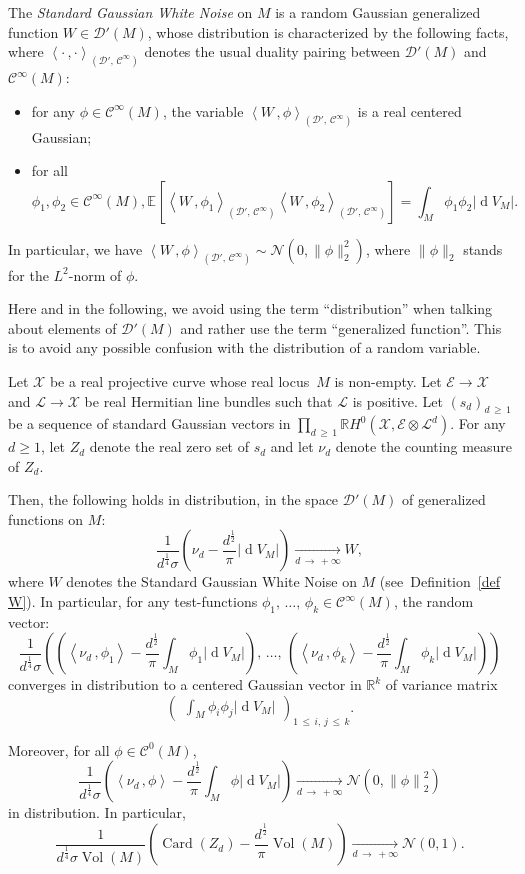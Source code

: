 \documentclass[AHL,Unicode,longabstracts,published]{cedram}
\DeclareMathOperator{\card}{Card}
\DeclareMathOperator{\dmesure}{d}
\DeclareMathOperator{\Vol}{Vol}
\newcommand{\D}{\mathcal{D}}
\newcommand{\E}{\mathcal{E}}
\newcommand{\X}{\mathcal{X}}
\renewcommand{\L}{\mathcal{L}}
\newcommand{\clN}{\mathcal{N}}
\newcommand{\clC}{\mathcal{C}}
\newcommand{\R}{\mathbb{R}}
\newcommand{\esp}[2][]{\mathbb{E}_{#1}\!\left[#2 \right]}
\newcommand{\norm}[1]{\left\lvert #1 \right\rvert}
\newcommand{\Norm}[1]{\left\lVert #1 \right\rVert}
\newcommand{\prsc}[2]{\left\langle #1\,, #2 \right\rangle}
\newcommand{\rmes}[1]{\norm{\dmesure\! V_{#1}}}
\newcommand{\vol}[1]{\Vol\!\left(#1\right)}
\renewcommand{\H}{H^0(\X,\E \otimes \L^d)}
\renewcommand{\geq}{\geqslant}
\renewcommand{\leq}{\leqslant}
\begin{document}
\begin{defi}\label{def W}
The \emph{Standard Gaussian White Noise} on $M$ is a random Gaussian generalized function $W \in \D'(M)$, whose distribution is characterized by the following facts, where $\prsc{\cdot}{\cdot}_{(\D',\,\clC^\infty)}$ denotes the usual duality pairing between $\D'(M)$ and $\clC^\infty(M)$:
\begin{itemize}
\item for any $\phi \in \clC^\infty(M)$, the variable $\prsc{W}{\phi}_{(\D',\,\clC^\infty)}$ is a real centered Gaussian;
\item for all 
\[
\phi_1,\phi_2 \in \clC^\infty(M), \esp{\prsc{W}{\phi_1}_{\left(\D',\,\clC^\infty\right)}\prsc{W}{\phi_2}_{\left(\D',\,\clC^\infty\right)}}= \int_M \phi_1 \phi_2 \rmes{M}.
\]
\end{itemize}
In particular, we have $\prsc{W}{\phi}_{(\D',\,\clC^\infty)} \sim \clN(0,\|\phi\|^2_2)$, where $\|\phi\|_2$ stands for the $L^2$-norm of $\phi$.
\end{defi}

Here and in the following, we avoid using the term ``distribution'' when talking about elements of $\D'(M)$ and rather use the term ``generalized function''. This is to avoid any possible confusion with the distribution of a random variable.

\begin{theo}\label{thm central limit theorem}
Let $\X$ be a real projective curve whose real locus~$M$ is non-empty. Let $\E \to \X$ and $\L \to \X$ be real Hermitian line bundles such that $\L$ is positive. Let $(s_d)_{d\,\geq\,1}$ be a sequence of standard Gaussian vectors in $\prod_{d \,\geq\,1}\R \H$. For any $d \geq 1$, let $Z_d$ denote the real zero set of $s_d$ and let $\nu_d$ denote the counting measure of $Z_d$.

Then, the following holds in distribution, in the space $\D'(M)$ of generalized functions on $M$:
\[
\frac{1}{d^\frac{1}{4}\sigma}\left(\nu_d - \frac{d^\frac{1}{2}}{\pi}\rmes{M}\right) \xrightarrow[d\,\to\,+\infty]{} W,
\]
where $W$ denotes the Standard Gaussian White Noise on $M$ (see~Definition~\ref{def W}). In particular, for any test-functions $\phi_1,\,\dots,\,\phi_k \in \clC^\infty(M)$, the random vector:
\[
\frac{1}{d^\frac{1}{4}\sigma}\left(\left(\prsc{\nu_d}{\phi_1} - \frac{d^\frac{1}{2}}{\pi}\int_M \phi_1\rmes{M}\right),\,\dots,\, \left(\prsc{\nu_d}{\phi_k} - \frac{d^\frac{1}{2}}{\pi}\int_M \phi_k\rmes{M}\right)\right)
\]
converges in distribution to a centered Gaussian vector in $\R^k$ of variance matrix 
\[
\begin{pmatrix}
\displaystyle\int_M \phi_i \phi_j \rmes{M}
\end{pmatrix}_{1\,\leq\,i,\,j\,\leq\,k}.
\]

Moreover, for all $\phi \in \clC^0(M)$,
\[
\frac{1}{d^\frac{1}{4}\sigma}\left(\prsc{\nu_d}{\phi} - \frac{d^\frac{1}{2}}{\pi}\int_M \phi\rmes{M}\right) \xrightarrow[d\,\to\,+\infty]{} \clN\left(0,\Norm{\phi}_2^2\right)
\]
in distribution. In particular,
\[
\frac{1}{d^\frac{1}{4}\sigma\vol{M}}\left(\card(Z_d) - \frac{d^\frac{1}{2}}{\pi} \vol{M}\right) \xrightarrow[d\,\to\,+\infty]{} \clN(0,1).
\]
\end{theo}
\end{document}
